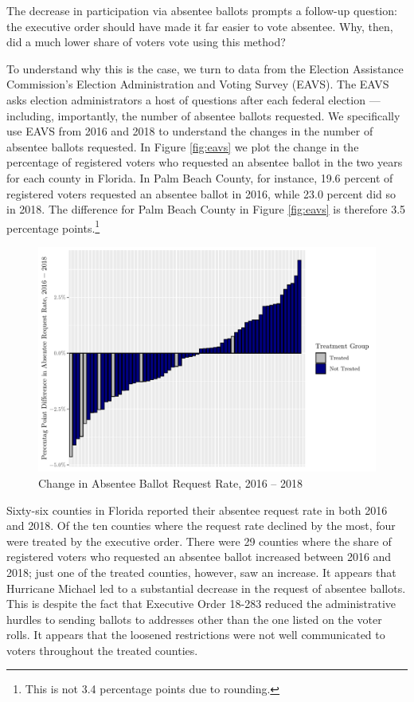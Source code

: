 \documentclass[
  12pt,
]{article}
\begin{document}
The decrease in participation via absentee ballots prompts a follow-up question: the executive order should have made it far easier to vote absentee. Why, then, did a much lower share of voters vote using this method?

To understand why this is the case, we turn to data from the Election Assistance Commission's Election Administration and Voting Survey (EAVS). The EAVS asks election administrators a host of questions after each federal election --- including, importantly, the number of absentee ballots requested. We specifically use EAVS from 2016 and 2018 to understand the changes in the number of absentee ballots requested. In Figure \ref{fig:eavs} we plot the change in the percentage of registered voters who requested an absentee ballot in the two years for each county in Florida. In Palm Beach County, for instance, 19.6 percent of registered voters requested an absentee ballot in 2016, while 23.0 percent did so in 2018. The difference for Palm Beach County in Figure \ref{fig:eavs} is therefore 3.5 percentage points.\footnote{This is not 3.4 percentage points due to rounding.}

\begin{figure}[H]

{\centering \includegraphics{hurricane_michael_files/figure-latex/eavs-chunk-1} 

}

\caption{\label{fig:eavs}Change in Absentee Ballot Request Rate, 2016 -- 2018}\label{fig:eavs-chunk}
\end{figure}

Sixty-six counties in Florida reported their absentee request rate in both 2016 and 2018. Of the ten counties where the request rate declined by the most, four were treated by the executive order. There were 29 counties where the share of registered voters who requested an absentee ballot increased between 2016 and 2018; just one of the treated counties, however, saw an increase. It appears that Hurricane Michael led to a substantial decrease in the request of absentee ballots. This is despite the fact that Executive Order 18-283 reduced the administrative hurdles to sending ballots to addresses other than the one listed on the voter rolls. It appears that the loosened restrictions were not well communicated to voters throughout the treated counties.
\end{document}
